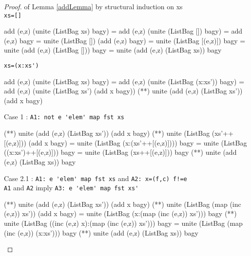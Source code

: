 \begin{proof} of Lemma \ref{addLemma} by structural induction on xs\\
\verb|xs=[]|
\begin{code}
add (e,z) (unite (ListBag xs) bagy) 
             = add (e,z) (unite (ListBag []) bagy)
             = add (e,z) bagy
             = unite (ListBag []) (add (e,z) bagy)
             = unite (ListBag [(e,z)]) bagy
             = unite (add (e,z) (ListBag [])) bagy
             = unite (add (e,z) (ListBag xs)) bagy
\end{code}
\verb|xs=(x:xs')|
\begin{code}
add (e,z) (unite (ListBag xs) bagy)
             = add (e,z) (unite (ListBag (x:xs')) bagy)
             = add (e,z) (unite (ListBag xs') (add x bagy))
             (**) unite (add (e,z) (ListBag xs')) (add x bagy)
\end{code}
\hspace{1cm}Case 1 : \verb|A1: not e 'elem' map fst xs|
\begin{code}
             (**) unite (add (e,z) (ListBag xs')) (add x bagy)
             (**) unite (ListBag (xs'++[(e,z)])) (add x bagy)
             = unite (ListBag (x:(xs'++[(e,z)]))) bagy
             = unite (ListBag ((x:xs')++[(e,z)])) bagy
             = unite (ListBag (xs++[(e,z)])) bagy
             (**) unite (add (e,z) (ListBag xs)) bagy

\end{code}
\hspace{1cm}Case 2.1 : \verb|A1: e 'elem' map fst xs| and \verb|A2: x=(f,c) f!=e|\\
\verb|A1| and \verb|A2| imply \verb|A3: e 'elem' map fst xs'|
\begin{code}
             (**) unite (add (e,z) (ListBag xs')) (add x bagy)
             (**) unite (ListBag (map (inc (e,z)) xs')) (add x bagy)
             = unite (ListBag (x:(map (inc (e,z)) xs'))) bagy
             (**) unite (ListBag ((inc (e,z) x):(map (inc (e,z)) xs'))) bagy
             = unite (ListBag (map (inc (e,z)) (x:xs'))) bagy
             (**) unite (add (e,z) (ListBag xs)) bagy


\end{code}
\end{proof}

